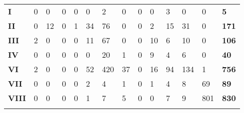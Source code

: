 \documentclass[output=paper]{langscibook}
\begin{document}
\begin{sidewaystable}[]
\begin{tabular}{@{}llllllllllllll@{}}
	\textbf{I} & 0 & 0 & 0 & 0 & 0 & 2 & 0 & 0 & 0 & 3 & 0 & 0 & \textbf{5} \\
	\textbf{II} & 0 & 12 & 0 & 1 & 34 & 76 & 0 & 0 & 2 & 15 & 31 & 0 & \textbf{171} \\
	\textbf{III} & 2 & 0 & 0 & 0 & 11 & 67 & 0 & 0 & 10 & 6 & 10 & 0 & \textbf{106} \\
	\textbf{IV} & 0 & 0 & 0 & 0 & 0 & 20 & 1 & 0 & 9 & 4 & 6 & 0 & \textbf{40} \\
	\textbf{VI} & 2 & 0 & 0 & 0 & 52 & 420 & 37 & 0 & 16 & 94 & 134 & 1 & \textbf{756} \\
	\textbf{VII} & 0 & 0 & 0 & 0 & 2 & 4 & 1 & 0 & 1 & 4 & 8 & 69 & \textbf{89} \\
	\textbf{VIII} & 0 & 0 & 0 & 0 & 1 & 7 & 5 & 0 & 0 & 7 & 9 & 801 & \textbf{830} \\ \lspbottomrule
	\end{tabular}
\end{sidewaystable}

\clearpage

{\sloppy\printbibliography[heading=subbibliography,notkeyword=this]}
\end{document}
